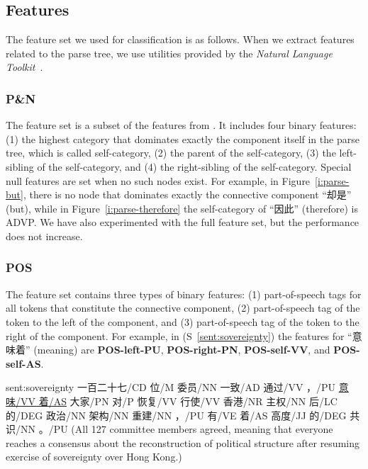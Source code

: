 \subsection{Features}
\label{s:comp-features}

The feature set we used for classification is as follows.
When we extract features related to the parse tree, we use utilities provided by the
\textit{Natural Language Toolkit}~\citep{BirdKleinLoper09}.

\subsubsection{P\&N}

The feature set is a subset of the features from
\cite{pitler2009using}. It includes four binary features:
(1) the highest category that dominates exactly the component
itself in the parse tree, which is called self-category, (2) the parent of the self-category,
(3) the left-sibling of the self-category, and (4) the right-sibling of the self-category.
Special null features are set when no such nodes exist. For example,
in Figure~\ref{i:parse-but}, there is no node that dominates exactly the
connective component ``却是'' (but), while in Figure~\ref{i:parse-therefore} the
self-category of ``因此'' (therefore) is ADVP. We have also experimented
with the full feature set, but the performance does not increase.



\subsubsection{POS}

The feature set contains three types of binary features:
(1) part-of-speech tags for all tokens that constitute the connective component,
(2) part-of-speech tag of the token to the left of the component, and
(3) part-of-speech tag of the token to the right of the component. For example,
in (S~\ref{sent:sovereignty}) the features for ``意味着'' (meaning) are
\textbf{POS-left-PU}, \textbf{POS-right-PN}, \textbf{POS-self-VV}, and
\textbf{POS-self-AS}.

\begin{sent}{sent:sovereignty}{}
    一百二十七/CD 位/M 委员/NN 一致/AD 通过/VV ，/PU \underline{意味/VV 着/AS} 大家/PN 对/P
    恢复/VV 行使/VV 香港/NR 主权/NN 后/LC 的/DEG 政治/NN 架构/NN 重建/NN ，/PU
    有/VE 着/AS 高度/JJ 的/DEG 共识/NN 。/PU
    (All 127 committee members agreed, meaning that everyone reaches a consensus about
    the reconstruction of political structure after resuming exercise of sovereignty over Hong Kong.)
\end{sent}


